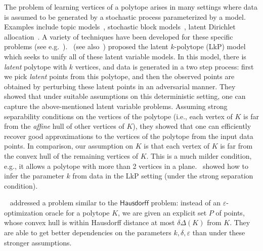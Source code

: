 \documentclass[11pt,letterpaper]{article}
\newcommand{\Hausdorf}{\mathsf {Hausdorff}\xspace }
\begin{document}
The problem of learning vertices of a polytope arises in many settings where data is assumed to be generated by a stochastic process parameterized by a model. Examples include topic models~\cite{Blei12}, stochastic block models~\cite{AiroldiBEF14}, latent Dirichlet allocation~\cite{BleiNJ03}. A variety of techniques have been developed for these specific problems (see e.g.~\cite{AnandkumarFHKL15, AroraGHMMSWZ18,HopkinsS17}).~\cite{BhattacharyyaK20} (see also~\cite{BakshiBKWZ21}) proposed the latent $k$-polytope (LkP) model which seeks to unify all of these latent variable models. In this model, there is {\em latent} polytope with $k$ vertices, and data is generated in a two step process: first we pick {\em latent} points from this polytope, and then the observed points are obtained by perturbing these latent points in an adversarial manner. They showed that under suitable assumptions on this deterministic setting, one can capture the above-mentioned latent variable problems. Assuming strong separability conditions on the vertices of the polytope (i.e., each vertex of $K$ is far from the {\em affine} hull of other vertices of $K$), they showed that one can efficiently  recover good approximations to the vertices of the polytope from the input data points. In comparison, our assumption on $K$ is that each vertex of $K$ is far from the convex hull of the remaining vertices of $K$. This is a much milder condition, e.g., it allows a polytope with more than 2 vertices in a plane.~\cite{BhattacharyyaK021} showed how to infer the parameter $k$ from data in the LkP setting (under the strong separation condition). 

~\cite{BlumHR19} addressed a problem similar to the $\Hausdorf$ problem: instead of an $\varepsilon$-optimization oracle for a polytope $K$, we are given an explicit set $P$ of points, whose convex hull is within  Hausdorff distance at most $\delta\Delta(K)$ from $K$. They are able to get better dependencies on the parameters $k,\delta,\varepsilon$ than  under these stronger assumptions. 
\end{document}

